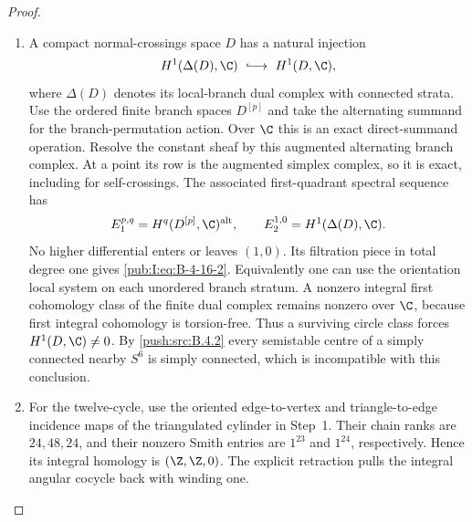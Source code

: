\begin{proof}
\begin{enumerate}[label=\arabic*.,leftmargin=*]
\item A compact normal-crossings space $D$
has a natural injection
\begin{equation}
 H^1(\Delta(D),\C)\ \lhook\joinrel\longrightarrow\
 H^1(D,\C),
\label{pub:I:eq:B-4-16-2}
\end{equation}
where $\Delta(D)$ denotes its local-branch dual
complex with connected strata. Use the ordered finite
branch spaces $D^{[p]}$ and take the alternating
summand for the branch-permutation action. Over $\C$
this is an exact direct-summand operation. Resolve the
constant sheaf by this augmented alternating branch
complex. At a point its row is the augmented simplex
complex, so it is exact, including for self-crossings.
The associated first-quadrant spectral sequence has
\[
 E_1^{p,q}=H^q(D^{[p]},\C)^{\mathrm{alt}},
 \qquad
 E_2^{1,0}=H^1(\Delta(D),\C).
\]
No higher differential enters or leaves $(1,0)$.
Its filtration piece in total degree one gives
\eqref{pub:I:eq:B-4-16-2}. Equivalently one can use the orientation
local system on each unordered branch stratum. A nonzero integral first cohomology
class of the finite dual complex remains nonzero over
$\C$, because first integral cohomology is torsion-free.
Thus a surviving circle class forces $H^1(D,\C)\ne0$.
By \ref{push:src:B.4.2} every semistable centre of
a simply connected nearby $S^6$ is simply connected,
which is incompatible with this conclusion.

\item For the twelve-cycle, use the oriented edge-to-vertex and
triangle-to-edge incidence maps of the triangulated cylinder in Step~1.
Their chain ranks are $24,48,24$, and their nonzero Smith entries are
$1^{23}$ and $1^{24}$, respectively. Hence its integral homology is
$(\Z,\Z,0)$. The explicit retraction pulls the integral angular cocycle
back with winding one.
\end{enumerate}
\end{proof}